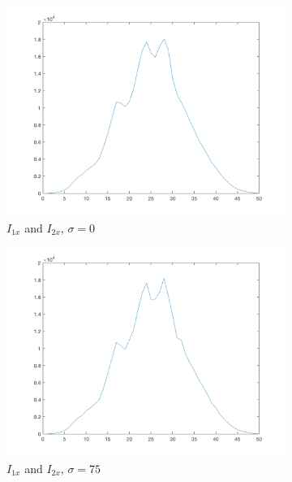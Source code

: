 \begin{figure}[htpb]
\begin{subfigure}{.25\textwidth}
\includegraphics[width=1\textwidth]{img/ProjYI2sigma0}
\caption{$I_{1x}$ and $I_{2x}$, $\sigma\!=\!0$}
\end{subfigure}%
\begin{subfigure}{.25\textwidth}
\includegraphics[width=1\textwidth]{img/ProjYI2sigma75}
\caption{$I_{1x}$ and $I_{2x}$, $\sigma\!=\!75$}
\end{subfigure}%
\begin{subfigure}{.25\textwidth}

\end{subfigure}
\end{figure}

